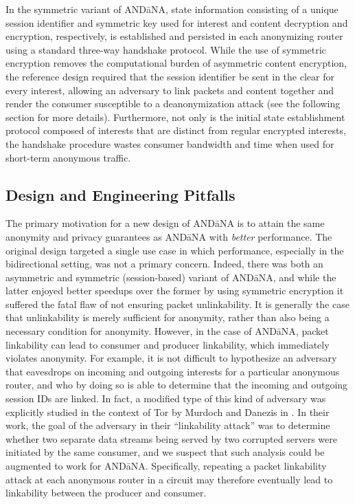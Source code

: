 In the symmetric variant of {\sf AND\=aNA}, state information consisting of a unique session identifier and symmetric key used for interest and content decryption and encryption, respectively, is established and persisted in each anonymizing router using a standard three-way handshake protocol. While the use of symmetric encryption removes the computational burden of asymmetric content encryption, the reference design required that the session identifier be sent in the clear for every interest, allowing an adversary to link packets and content together and render the consumer susceptible to a deanonymization attack (see the following section for more details). Furthermore, not only is the initial state establishment protocol composed of interests that are distinct from regular encrypted interests, the handshake procedure wastes consumer bandwidth and time when used for short-term anonymous traffic. 


\subsection{Design and Engineering Pitfalls}
The primary motivation for a new design of {\sf AND\=aNA} is to attain the same anonymity and privacy guarantees as {\sf AND\=aNA} with \emph{better} performance. The original design targeted a single use case in which performance, especially in the bidirectional setting, was not a primary concern. Indeed, there was both an asymmetric and symmetric (session-based) variant of {\sf AND\=aNA}, and while the latter enjoyed better speedups over the former by using symmetric encryption it suffered the fatal flaw of not ensuring packet unlinkability. It is generally the case that unlinkability is merely sufficient for anonymity, rather than also being a necessary condition for anonymity. However, in the case of {\sf AND\=aNA}, packet linkability can lead to consumer and producer linkability, which immediately violates anonymity. For example, it is not difficult to hypothesize an adversary that eavesdrops on incoming and outgoing interests for a particular anonymous router, and who by doing so is able to determine that the incoming and outgoing session IDs are linked. In fact, a modified type of this kind of adversary was explicitly studied in the context of Tor by Murdoch and Danezis in \cite{tor-traffic-analysis}. In their work, the goal of the adversary in their ``linkability attack'' was to determine whether two separate data streams being served by two corrupted servers were initiated by the same consumer, and we suspect that such analysis could be augmented to work for {\sf AND\=aNA}. Specifically, repeating a packet linkability attack at each anonymous router in a circuit may therefore eventually lead to linkability between the producer and consumer. 

